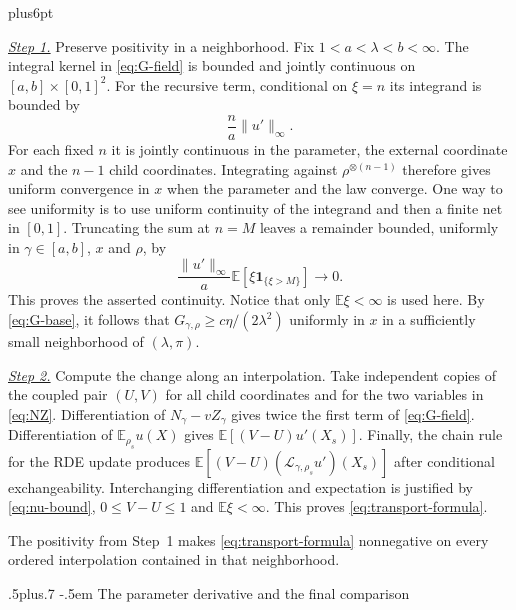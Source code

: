 \documentclass[11pt,reqno]{amsart}
\makeatletter
\def\subsection{\@startsection{subsection}{2}{0pt}%
  {.5\linespacing plus.7\linespacing}
  {-.5em}
  {\normalfont\scshape}}
\theoremstyle{plain}
\theoremstyle{definition}
\theoremstyle{remark}
\renewenvironment{proof}[1][\proofname]{%
  \par
  \pushQED{\qed}%
  \normalfont
  \topsep6pt plus6pt\relax
  \trivlist
  \item[\hskip\labelsep\slshape #1\@addpunct{.}]%
  \ignorespaces
}{%
  \popQED
  \endtrivlist
  \@endpefalse
}
\DeclareRobustCommand{\qed}{%
  \leavevmode\unskip\penalty9999\hbox{}\nobreak
  \ifmmode
    \makebox[0pt][l]{\qquad\hbox{\qedsymbol}}%
  \else
    \qquad\hbox{\qedsymbol}%
  \fi
}
\renewcommand{\qedsymbol}{\rule[.47pt]{4pt}{6pt}}
\numberwithin{equation}{section}
\newcommand{\E}{\mathbb E}
\newcommand{\cL}{\mathcal L}
\makeatother
\begin{document}
\begin{proof}
\smallskip\noindent
\underline{\textit{Step 1.}} Preserve positivity in a neighborhood.
Fix $1<a<\lambda<b<\infty$. The integral kernel in \eqref{eq:G-field} is
bounded and jointly continuous on $[a,b]\times[0,1]^2$.
For the recursive term, conditional on $\xi=n$ its integrand is bounded by
\begin{equation}\label{eq:nu-bound}
 \frac{n}{a}\|u'\|_\infty.
\end{equation}
For each fixed $n$ it is jointly continuous in the parameter, the external
coordinate $x$ and the $n-1$ child coordinates. Integrating against
$\rho^{\otimes(n-1)}$ therefore gives uniform convergence in $x$ when the
parameter and the law converge. One way to see uniformity is to use uniform
continuity of the integrand and then a finite net in $[0,1]$.
Truncating the sum at $n=M$ leaves a remainder bounded, uniformly in
$\gamma\in[a,b]$, $x$ and $\rho$, by
\begin{equation}\label{eq:nu-tail}
 \frac{\|u'\|_\infty}{a}\E[\xi\mathbf1_{\{\xi>M\}}]\longrightarrow0.
\end{equation}
This proves the asserted continuity. Notice that only $\E\xi<\infty$ is
used here. By \eqref{eq:G-base}, it follows that
$G_{\gamma,\rho}\ge c\eta/(2\lambda^2)$ uniformly in $x$ in a sufficiently small
neighborhood of $(\lambda,\pi)$.

\smallskip\noindent
\underline{\textit{Step 2.}} Compute the change along an interpolation.
Take independent copies of the coupled pair
$(U,V)$ for all child coordinates and for the two variables in
\eqref{eq:NZ}. Differentiation of $N_\gamma-vZ_\gamma$ gives twice the first
term of \eqref{eq:G-field}. Differentiation of $\E_{\rho_s}u(X)$ gives
$\E[(V-U)u'(X_s)]$. Finally, the chain rule for the RDE update produces
$\E[(V-U)(\cL_{\gamma,\rho_s}u')(X_s)]$ after conditional
exchangeability. Interchanging differentiation and expectation is justified
by \eqref{eq:nu-bound}, $0\le V-U\le1$ and $\E\xi<\infty$.
This proves \eqref{eq:transport-formula}.

The positivity from Step~1 makes \eqref{eq:transport-formula} nonnegative
on every ordered interpolation contained in that neighborhood.
\end{proof}

\subsection{The parameter derivative and the final comparison}
\end{document}

